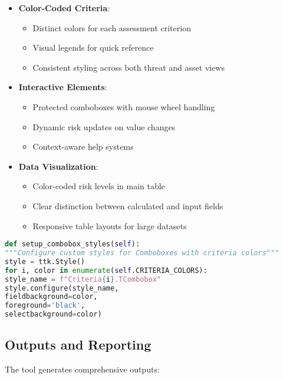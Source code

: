 \documentclass[binding=0.6cm]{sapthesis}
\begin{document}
\begin{itemize}
\item \textbf{Color-Coded Criteria}:
\begin{itemize}
\item Distinct colors for each assessment criterion
\item Visual legends for quick reference
\item Consistent styling across both threat and asset views
\end{itemize}

\item \textbf{Interactive Elements}:
\begin{itemize}
    \item Protected comboboxes with mouse wheel handling
    \item Dynamic risk updates on value changes
    \item Context-aware help systems
\end{itemize}

\item \textbf{Data Visualization}:
\begin{itemize}
    \item Color-coded risk levels in main table
    \item Clear distinction between calculated and input fields
    \item Responsive table layouts for large datasets
\end{itemize}
\end{itemize}

\begin{lstlisting}[language=Python, caption=Interface Configuration]
def setup_combobox_styles(self):
"""Configure custom styles for Comboboxes with criteria colors"""
style = ttk.Style()
for i, color in enumerate(self.CRITERIA_COLORS):
style_name = f"Criteria{i}.TCombobox"
style.configure(style_name,
fieldbackground=color,
foreground='black',
selectbackground=color)
\end{lstlisting}

\subsection{Outputs and Reporting}

The tool generates comprehensive outputs:
\end{document}
